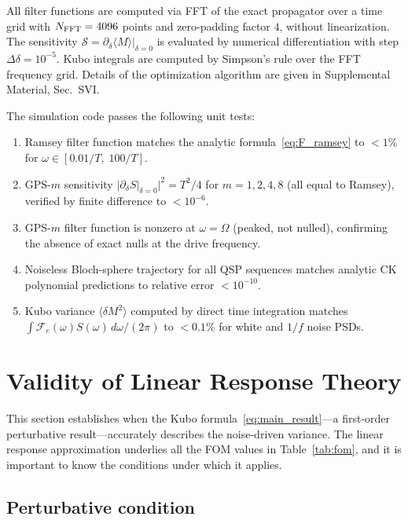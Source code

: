 \documentclass[aps,pra,twocolumn,superscriptaddress,longbibliography]{revtex4-2}
\begin{document}
All filter functions are computed via FFT of the exact propagator over a time
grid with $N_{\rm FFT}=4096$ points and zero-padding factor $4$, without
linearization.
The sensitivity $\mathcal{S}=\partial_\delta\langle M\rangle|_{\delta=0}$ is
evaluated by numerical differentiation with step $\Delta\delta=10^{-5}$.
Kubo integrals are computed by Simpson's rule over the FFT frequency grid.
Details of the optimization algorithm are given in Supplemental Material,
Sec.~SVI.

The simulation code passes the following unit tests:
\begin{enumerate}
  \item Ramsey filter function matches the analytic
        formula~\eqref{eq:F_ramsey} to $<1\%$ for
        $\omega\in[0.01/T,\;100/T]$.
  \item GPS-$m$ sensitivity $|\partial_\delta S|_{\delta=0}|^2=T^2/4$ for
        $m=1,2,4,8$ (all equal to Ramsey), verified by finite difference to
        $<10^{-6}$.
  \item GPS-$m$ filter function is nonzero at $\omega=\Omega$ (peaked, not
        nulled), confirming the absence of exact nulls at the drive frequency.
  \item Noiseless Bloch-sphere trajectory for all QSP sequences matches
        analytic CK polynomial predictions to relative error $<10^{-10}$.
  \item Kubo variance $\langle\delta M^2\rangle$ computed by direct time
        integration matches
        $\int\mathcal{F}_e(\omega)S(\omega)\,d\omega/(2\pi)$ to $<0.1\%$
        for white and $1/f$ noise PSDs.
\end{enumerate}
\section{Validity of Linear Response Theory}
\label{sec:validity}

This section establishes when the Kubo formula~\eqref{eq:main_result}---a first-order
perturbative result---accurately describes the noise-driven variance.
The linear response approximation underlies all the FOM values in Table~\ref{tab:fom},
and it is important to know the conditions under which it applies.

\subsection{Perturbative condition}
\label{sec:pert_condition}
\end{document}
